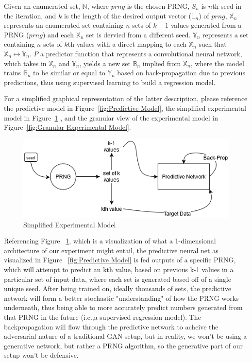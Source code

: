 \documentclass[conference]{IEEEtran}
\begin{document}
Given an enumerated set, $\mathbb{N}$,
where $prng$ is the chosen PRNG, $S_n$ is $n$th seed in the iteration, and $k$ is the length of the desired output vector ($\mathbb{L}_n$) of $prng$,
$\mathbb{X}_n$ represents an enumerated set containing $n$ sets of $k-1$ values generated from a PRNG ($prng$) and each $\mathbb{X}_n$ set is dervied from a different seed. $\mathbb{Y}_n$ represents a set containing $n$ sets of $k$th values with a direct mapping to each $\mathbb{X}_n$ such that $\mathbb{X}_n \mapsto \mathbb{Y}_n$. $P$ a predictor function that represents a convolutional neural network, which takes in $\mathbb{X}_n$ and $\mathbb{Y}_n$, yields a new set $\mathbb{B}_n$ implied from $\mathbb{X}_n$, where the model trains $\mathbb{B}_n$ to be similar or equal to $\mathbb{Y}_n$ based on back-propagation due to previous predictions, thus using supervised learning to build a regression model.

For a simplified graphical representation of the latter description, please reference the predictive model in Figure~\ref{fig:Predictive Model}, the simplified experimental model in Figure~\ref{fig:Simplified Experimental Model} , and the granular view of the experimental model in Figure~\ref{fig:Granular Experimental Model}.


\begin{figure}[H]
\centering
\includegraphics[width=1\linewidth]{./Images/SimpleModel.png}
\caption{Simplified Experimental Model}
\label{fig:Simplified Experimental Model}
\end{figure}

Referencing Figure ~\ref{fig:Simplified Experimental Model}, which is a visualization of what a 1-dimensional architecture of our experiment might entail, the predictive neural net as visualized in Figure ~\ref{fig:Predictive Model} is fed outputs of a specific PRNG, which will attempt to predict an kth value, based on previous k-1 values in a particular set of input data, where each set is generated based off of a single unique seed. After being trained on, ideally thousands of sets, the predictive network will form a better stochastic "understanding" of how the PRNG works underneath, thus being able to more accurately predict numbers generated from that PRNG in the future (i.e.,a supervised regression model). The backpropagation will flow through the predictive network to acheive the adversarial nature of a traditional GAN setup, but in reality, we won't be using a generative network, but rather a PRNG algorithm, so the generative part of our setup won't be defensive.
\end{document}
